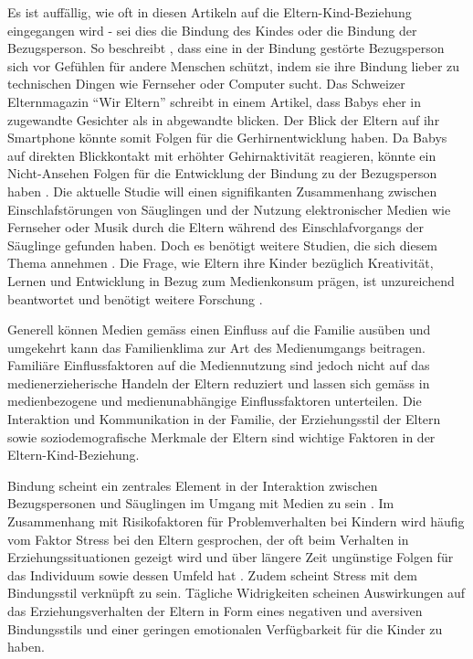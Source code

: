 Es ist auffällig, wie oft in diesen Artikeln auf die Eltern-Kind-Beziehung eingegangen wird - sei dies die Bindung des Kindes oder die Bindung der Bezugsperson. So beschreibt , dass eine in der Bindung gestörte Bezugsperson sich vor Gefühlen für andere Menschen schützt, indem sie ihre Bindung lieber zu technischen Dingen wie Fernseher oder Computer sucht. Das Schweizer Elternmagazin \enquote{Wir Eltern} schreibt in einem Artikel, dass Babys eher in zugewandte Gesichter als in abgewandte blicken. Der Blick der Eltern auf ihr Smartphone könnte somit Folgen für die Gerhirnentwicklung haben. Da Babys auf direkten Blickkontakt mit erhöhter Gehirnaktivität reagieren, könnte ein Nicht-Ansehen Folgen für die Entwicklung der Bindung zu der Bezugsperson haben \cite{Weber2017}. Die aktuelle Studie  will einen signifikanten Zusammenhang zwischen Einschlafstörungen von Säuglingen und der Nutzung elektronischer Medien wie Fernseher oder Musik durch die Eltern während des Einschlafvorgangs der Säuglinge gefunden haben. Doch es benötigt weitere Studien, die sich diesem Thema annehmen \cite{Wartella2016}. Die Frage, wie Eltern ihre Kinder bezüglich Kreativität, Lernen und Entwicklung in Bezug zum Medienkonsum prägen, ist unzureichend beantwortet und benötigt weitere Forschung \cite{AmericanAcademyofPediatrics2011,Troseth2016}. 

Generell können Medien gemäss  einen Einfluss auf die Familie ausüben und umgekehrt kann das Familienklima zur Art des Medienumgangs beitragen. Familiäre Einflussfaktoren auf die Mediennutzung sind  jedoch  nicht  auf  das  medienerzieherische  Handeln  der  Eltern  reduziert  und  lassen sich gemäss  in medienbezogene und medienunabhängige Einflussfaktoren unterteilen. Die Interaktion und Kommunikation in der Familie, der Erziehungsstil der Eltern sowie soziodemografische Merkmale der Eltern sind wichtige Faktoren in der Eltern-Kind-Beziehung.

Bindung scheint ein zentrales Element in der Interaktion zwischen Bezugspersonen und Säuglingen im Umgang mit Medien zu sein \cite{Prekop2017, Huether2017, Blikk2017}. Im Zusammenhang mit Risikofaktoren für Problemverhalten bei Kindern wird häufig vom Faktor Stress bei den Eltern gesprochen, der oft beim Verhalten in Erziehungssituationen gezeigt wird und über längere Zeit ungünstige Folgen für das Individuum sowie dessen Umfeld hat \cite{Cina2009}. Zudem scheint Stress mit dem Bindungsstil verknüpft zu sein. Tägliche Widrigkeiten scheinen Auswirkungen auf das Erziehungsverhalten der Eltern in Form eines negativen und aversiven Bindungsstils \cite{Dumas1989, Webster-Stratton1988} und einer geringen emotionalen Verfügbarkeit für die Kinder \cite{Campbell1991} zu haben. 

